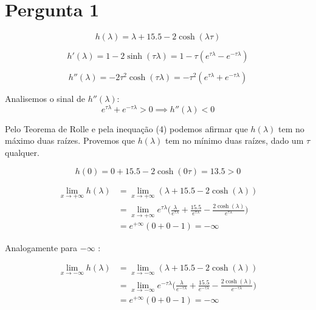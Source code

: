 \documentclass[a4paper, 12pt]{article}
\begin{document}


\section{Pergunta 1}
	\begin{equation}
		h(\lambda) = \lambda + 15.5 - 2\cosh(\lambda\tau)
	\end{equation}

	\begin{equation}
		h'(\lambda) = 1 - 2\sinh(\tau\lambda) = 1 - \tau(e^{\tau\lambda} - e^{-\tau\lambda})
	\end{equation}

	\begin{equation}
		h''(\lambda) = -2\tau^2\cosh(\tau\lambda) = -\tau^2(e^{\tau\lambda} + e^{-\tau\lambda})
	\end{equation}

	\par
	Analisemos o sinal de $h''(\lambda)$:
	\begin{equation}
		e^{\tau\lambda} + e^{-\tau\lambda} > 0 \implies h''(\lambda) < 0
	\end{equation}

	\par
	Pelo Teorema de Rolle e pela inequação (4) podemos afirmar que
	$h(\lambda)$ tem no máximo duas raízes. Provemos que $h(\lambda)$ tem no mínimo duas raízes, dado um $\tau$ qualquer.

	\begin{equation}
		h(0) = 0 + 15.5 - 2\cosh(0\tau) = 13.5 > 0
	\end{equation}

	\begin{equation}
	\begin{split}
		\lim_{x \to +\infty} h(\lambda)
		&= \lim_{x \to +\infty} (\lambda + 15.5 - 2\cosh(\lambda)) \\
		&= \lim_{x \to +\infty} e^{\tau\lambda} \bigg(\frac{\lambda}{e^{\tau\lambda}} + \frac{15.5}{e^{\tau\lambda}} - \frac{2\cosh(\lambda)}{e^{\tau\lambda}}\bigg) \\
		&= e^{+\infty} (0 + 0 - 1) = -\infty
	\end{split}
	\end{equation}

	\par
	Analogamente para  $-\infty$ :

	\begin{equation}
	\begin{split}
		\lim_{x \to -\infty} h(\lambda)
		&= \lim_{x \to -\infty} (\lambda + 15.5 - 2\cosh(\lambda)) \\
		&= \lim_{x \to -\infty} e^{-\tau\lambda} \bigg(\frac{\lambda}{e^{-\tau\lambda}} + \frac{15.5}{e^{-\tau\lambda}} - \frac{2\cosh(\lambda)}{e^{-\tau\lambda}}\bigg) \\
		&= e^{+\infty} (0 + 0 - 1) = -\infty
	\end{split}
	\end{equation}
\end{document}

